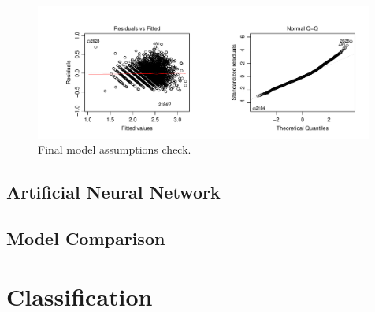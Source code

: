 \documentclass[10pt, paper=a4]{article}
\begin{document}
\begin{figure}[h]
  \centering
  \includegraphics[width = 0.99\textwidth]{finalmodelcheck.pdf}
  \caption{Final model assumptions check.}
  \label{fig:finalmodelcheck}
\end{figure}

\subsection{Artificial Neural Network}

\subsection{Model Comparison}

\clearpage
\section{Classification}
\label{sec:classification}

\end{document}
